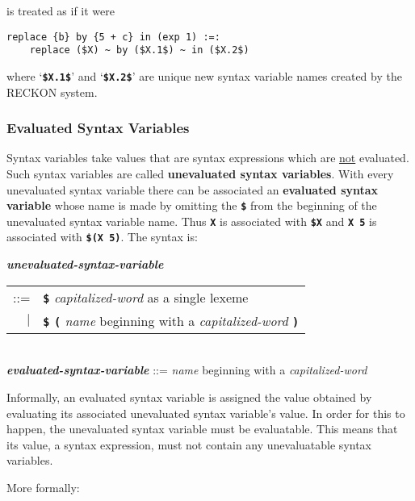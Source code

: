 \documentclass[12pt]{article}
\newcommand{\TT}[1]{{\tt \bfseries #1}}
\newcommand{\key}[1]{{\rm \bfseries #1}}
\newcommand{\emkey}[1]{{\em \bfseries #1}}
\newenvironment{indpar}[1][0.3in]%
	{\begin{list}{}%
		     {\setlength{\itemsep}{0in}%
		      \setlength{\topsep}{0in}%
		      \setlength{\parsep}{1ex}%
		      \setlength{\labelwidth}{#1}%
		      \setlength{\leftmargin}{#1}%
		      \addtolength{\leftmargin}{\labelsep}}%
	 \item}%
	{\end{list}}
\begin{document}
is treated as if it were

\begin{indpar}
\verb/replace {b} by {5 + c} in (exp 1) :=:/ \\
\verb/    replace ($X) ~ by ($X.1$) ~ in ($X.2$)/
\end{indpar}

where `\TT{\$X.1\$}' and `\TT{\$X.2\$}' are unique new
syntax variable names created by the RECKON system.




\subsubsection{Evaluated Syntax Variables}
\label{EVALUATED-SYNTAX-VARIABLES}

Syntax variables
take values that are syntax expressions
which are \underline{not} evaluated.  Such syntax variables are called
\key{unevaluated syntax variables}.  With every unevaluated syntax
variable there can be associated an \key{evaluated syntax variable}
whose name is made by omitting the \TT{\$} from the beginning of the
unevaluated syntax variable name.  Thus \TT{X} is associated with
\TT{\$X} and \TT{X 5} is associated with \TT{\$(X 5)}.  The syntax is:

\begin{indpar}
\emkey{unevaluated-syntax-variable}\label{UNEVALUATED-SYNTAX-VARIABLE}
			\begin{tabular}[t]{rl}
			::= & \TT{\$} {\em capitalized-word }
				as a single lexeme \\
			$|$ & \TT{\$} \TT{(} {\em name} beginning with a
			      {\em capitalized-word } \TT{)} \\
			\end{tabular}
\\[1ex]
\emkey{evaluated-syntax-variable} 
			::= {\em name} beginning with a {\em capitalized-word }
\end{indpar}

Informally, an evaluated syntax variable is assigned the value obtained by
evaluating its associated unevaluated syntax variable's value.  In order
for this to happen, the unevaluated syntax variable must be evaluatable.
This means that its value, a syntax expression, must not contain any
unevaluatable syntax variables.

More formally:
\end{document}
